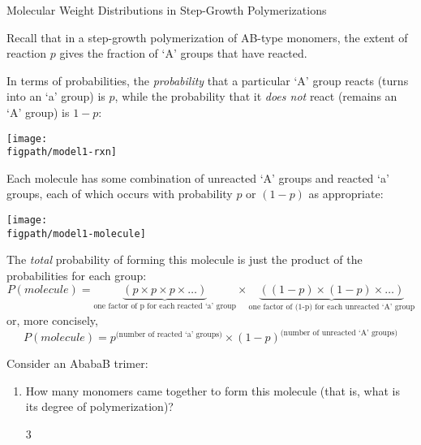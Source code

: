 \begin{activity}{Molecular Weight Distributions in Step-Growth Polymerizations}
\begin{instructornotes}
\end{instructornotes}


\begin{model}
\label{\labelbase:mdl:probabilities}

Recall that in a step-growth polymerization of AB-type monomers, the extent of reaction $p$ gives the fraction of `A' groups that have reacted.

In terms of probabilities, the \emph{probability} that a particular `A' group reacts (turns into an `a' group) is $p$, while the probability that it \emph{does not} react (remains an `A' group) is $1-p$:

	\centerline{\texttt{[image: \\figpath/model1-rxn]}}

	Each molecule has some combination of unreacted `A' groups and reacted `a' groups, each of which occurs with probability $p$ or $(1-p)$ as appropriate:

	\centerline{\texttt{[image: \\figpath/model1-molecule]}}
	
	The \emph{total} probability of forming this molecule is just the product of the probabilities for each group:
	\begin{equation*}
		P(molecule) = \underbrace{(p \times p \times p \times \dots)}_{\text{one factor of p for each reacted `a' group}} \times \underbrace{((1-p) \times (1-p) \times \dots)}_{\text{one factor of (1-p) for each unreacted `A' group}} 
	\end{equation*}
or, more concisely,
	\begin{equation*}
		P(molecule) = p^\text{(number of reacted `a' groups)}\times(1-p)^\text{(number of unreacted `A' groups)}
	\end{equation*}


\end{model}

\vspace{0.05in}
\begin{ctqs}
	
	\question Consider an AbabaB trimer:
		\begin{enumerate}
			\item How many monomers came together to form this molecule (that is, what is its degree of polymerization)?
			
				\begin{solution}[0.5in]
					3
				\end{solution}
				

\end{enumerate}
\end{ctqs}
\end{activity}
